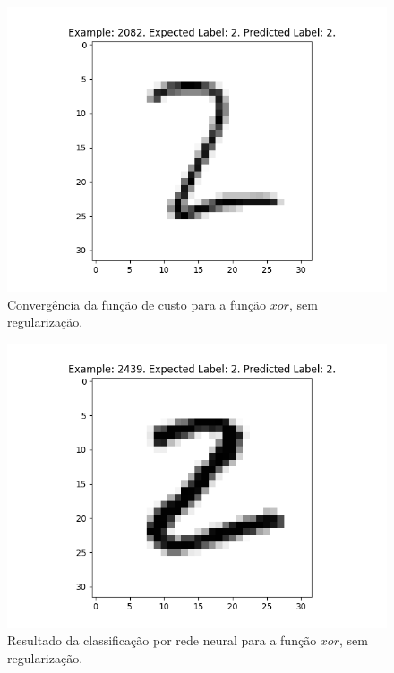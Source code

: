 \documentclass[conference]{IEEEtran}
\begin{document}
\begin{figure}[htbp]
\centering
\centerline{\includegraphics[scale=0.5]{imagens/test_image_2082.png}}
\caption{Convergência da função de custo para a função $xor$, sem regularização.}
\label{test_image_2082}
\end{figure}

\begin{figure}[htbp]
\centering
\centerline{\includegraphics[scale=0.5]{imagens/test_image_2439.png}}
\caption{Resultado da classificação por rede neural para a função $xor$, sem regularização.}
\label{test_image_2439}
\end{figure}
\end{document}
